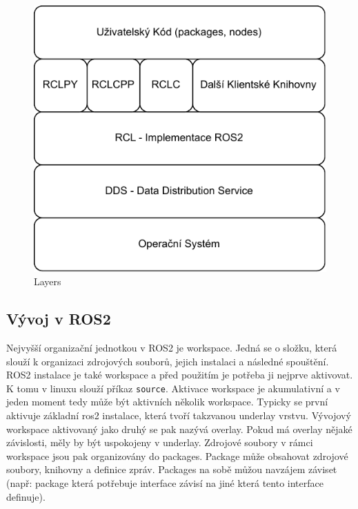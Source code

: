 \begin{figure}[h!]
	\centering
	\includegraphics[scale=0.75]{obrazky-figures/ros_layers.pdf}
	\caption{Layers}
	\label{}
\end{figure}

\subsection{Vývoj v ROS2} %
Nejvyšší organizační jednotkou v ROS2 je workspace. Jedná se o složku, která slouží k organizaci zdrojových souborů, jejich instalaci a následné spouštění. ROS2 instalace je také workspace a před použitím je potřeba ji nejprve aktivovat. K tomu v linuxu slouží příkaz \verb|source|. Aktivace workspace je akumulativní a v jeden moment tedy může být aktivních několik workspace. Typicky se první aktivuje základní ros2 instalace, která tvoří takzvanou underlay vrstvu. Vývojový workspace aktivovaný jako druhý se pak nazývá overlay. Pokud má overlay nějaké závislosti, měly by být uspokojeny v underlay.
Zdrojové soubory v rámci workspace jsou pak organizovány do packages. Package může obsahovat zdrojové soubory, knihovny a definice zpráv. Packages na sobě můžou navzájem záviset (např: package která potřebuje interface závisí na jiné která tento interface definuje). \cite{ros2_introduction}

